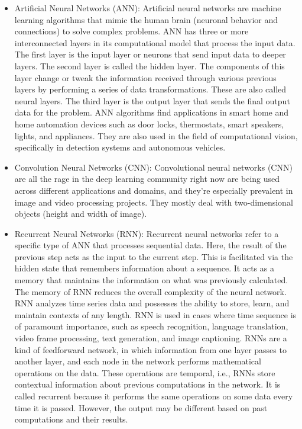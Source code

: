 \documentclass[11pt]{article}
\begin{document}
\begin{itemize}
\item Artificial Neural Networks (ANN): Artificial neural networks are machine learning algorithms that mimic the human brain (neuronal behavior and connections) to solve complex problems. ANN has three or more interconnected layers in its computational model that process the input data. The first layer is the input layer or neurons that send input data to deeper layers. The second layer is called the hidden layer. The components of this layer change or tweak the information received through various previous layers by performing a series of data transformations. These are also called neural layers. The third layer is the output layer that sends the final output data for the problem. ANN algorithms find applications in smart home and home automation devices such as door locks, thermostats, smart speakers, lights, and appliances. They are also used in the field of computational vision, specifically in detection systems and autonomous vehicles.
\item Convolution Neural Networks (CNN): Convolutional neural networks (CNN) are all the rage in the deep learning community right now are being used across different applications and domains, and they’re especially prevalent in image and video processing projects. They mostly deal with two-dimensional objects (height and width of image). 
\item Recurrent Neural Networks (RNN): Recurrent neural networks refer to a specific type of ANN that processes sequential data. Here, the result of the previous step acts as the input to the current step. This is facilitated via the hidden state that remembers information about a sequence. It acts as a memory that maintains the information on what was previously calculated. The memory of RNN reduces the overall complexity of the neural network. RNN analyzes time series data and possesses the ability to store, learn, and maintain contexts of any length. RNN is used in cases where time sequence is of paramount importance, such as speech recognition, language translation, video frame processing, text generation, and image captioning. RNNs are a kind of feedforward network, in which information from one layer passes to another layer, and each node in the network performs mathematical operations on the data. These operations are temporal, i.e., RNNs store contextual information about previous computations in the network. It is called recurrent because it performs the same operations on some data every time it is passed. However, the output may be different based on past computations and their results.


\end{itemize} 
\end{document}
